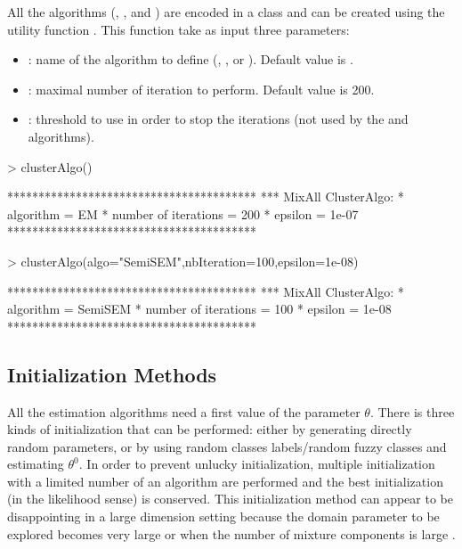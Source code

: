 \documentclass[shortnames,nojss,article]{jss}
\begin{document}
All the algorithms (, ,  and ) are
encoded in a  class and can be created using the utility function
. This function take as input three parameters:
\begin{itemize}
\item {}: name of the algorithm to define (,
,  or ). Default value is .
\item {}: maximal number of iteration to perform. Default value
is 200.
\item {}:  threshold to use in order to stop the iterations
(not used by the  and  algorithms).
\end{itemize}
\begin{Schunk}
\begin{Sinput}
> clusterAlgo()
\end{Sinput}
\begin{Soutput}
****************************************
*** MixAll ClusterAlgo:
* algorithm            =  EM 
* number of iterations =  200 
* epsilon              =  1e-07 
****************************************
\end{Soutput}
\begin{Sinput}
> clusterAlgo(algo="SemiSEM",nbIteration=100,epsilon=1e-08)
\end{Sinput}
\begin{Soutput}
****************************************
*** MixAll ClusterAlgo:
* algorithm            =  SemiSEM 
* number of iterations =  100 
* epsilon              =  1e-08 
****************************************
\end{Soutput}
\end{Schunk}

\subsection{Initialization Methods}\label{subsubsec:init}

All the estimation algorithms need a first value of the parameter $\theta$.
There is three kinds of initialization that can be performed: either by
generating directly random parameters, or by using random classes labels/random
fuzzy classes and estimating $\theta^0$. In order to prevent unlucky
initialization, multiple initialization with a limited number of an algorithm
are performed and the best initialization (in the likelihood sense) is
conserved. This initialization method can appear to be disappointing in a
large dimension setting because the domain parameter to be explored becomes
very large or when the number of mixture components is large \cite{baudry2015}.
\end{document}
